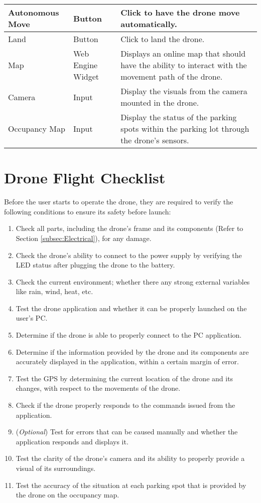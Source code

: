 \documentclass[12pt]{article}
\begin{document}
\begin{longtable}{| p{4cm} | p{4cm} | p{7cm} |}
\hline
Autonomous Move & Button & Click to have the drone move automatically. \\
\hline
Land & Button & Click to land the drone. \\
\hline
Map & Web Engine Widget & Displays an online map that should have the ability to interact with the movement path of the drone. \\
\hline
Camera & Input & Display the visuals from the camera mounted in the drone. \\
\hline
Occupancy Map & Input & Display the status of the parking spots within the parking lot through the drone's sensors. \\
\hline
\end{longtable}

\newpage

\section{Drone Flight Checklist}
\label{sec:umChecklist}

Before the user starts to operate the drone, they are required to verify the following conditions to ensure its safety before launch:

\begin{enumerate}
    \item Check all parts, including the drone's frame and its components (Refer to Section \ref{subsec:Electrical}), for any damage.
    \item Check the drone's ability to connect to the power supply by verifying the LED status after plugging the drone to the battery.
    \item Check the current environment; whether there any strong external variables like rain, wind, heat, etc.
    \item Test the drone application and whether it can be properly launched on the user's PC.
    \item Determine if the drone is able to properly connect to the PC application.
    \item Determine if the information provided by the drone and its components are accurately displayed in the application, within a certain margin of error.
    \item Test the GPS by determining the current location of the drone and its changes, with respect to the movements of the drone.
    \item Check if the drone properly responds to the commands issued from the application.
    \item (\textit{Optional}) Test for errors that can be caused manually and whether the application responds and displays it.
    \item Test the clarity of the drone's camera and its ability to properly provide a visual of its surroundings.
    \item Test the accuracy of the situation at each parking spot that is provided by the drone on the occupancy map.
\end{enumerate}
\end{document}
